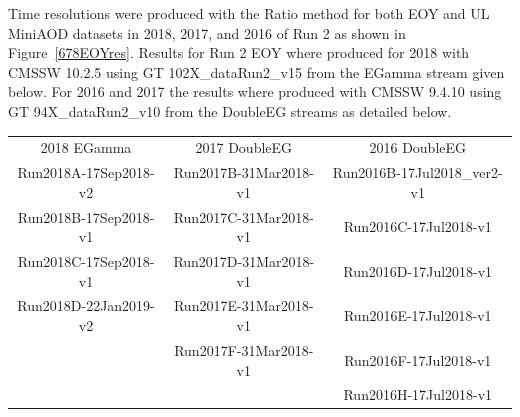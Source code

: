  

Time resolutions were produced with the Ratio method for both EOY and UL MiniAOD datasets in 2018, 2017, and 2016 of Run 2 as shown in Figure~\ref{678EOYres}. Results for Run 2 EOY where produced for 2018 with CMSSW 10.2.5 using GT 102X\_dataRun2\_v15 from the EGamma stream given below. For 2016 and 2017 the results where produced with CMSSW 9.4.10 using GT 94X\_dataRun2\_v10 from the DoubleEG streams as detailed below.

\begin{center}
\begin{tabular}{ c c c }
 2018 EGamma & 2017 DoubleEG & 2016 DoubleEG \\
 Run2018A-17Sep2018-v2 & Run2017B-31Mar2018-v1 & Run2016B-17Jul2018\_ver2-v1\\
 Run2018B-17Sep2018-v1 & Run2017C-31Mar2018-v1 & Run2016C-17Jul2018-v1 \\
 Run2018C-17Sep2018-v1 & Run2017D-31Mar2018-v1 & Run2016D-17Jul2018-v1 \\
 Run2018D-22Jan2019-v2 & Run2017E-31Mar2018-v1 & Run2016E-17Jul2018-v1 \\
                       & Run2017F-31Mar2018-v1 & Run2016F-17Jul2018-v1 \\
                       &                       & Run2016H-17Jul2018-v1
\end{tabular}
\end{center}


